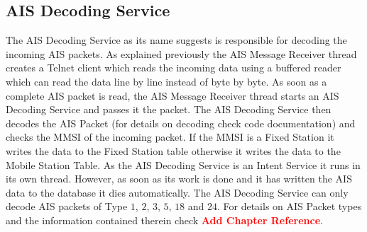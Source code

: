 \subsection{AIS Decoding Service}
\label{sec:sec5_2_3}
\noindent
%
The AIS Decoding Service as its name suggests is responsible for decoding the incoming AIS packets. As explained previously the AIS Message Receiver thread creates a Telnet client which reads the incoming data using a buffered reader which can read the data line by line instead of byte by byte. As soon as a complete AIS packet is read, the AIS Message Receiver thread starts an AIS Decoding Service and passes it the packet. 
\newline
\noindent
The AIS Decoding Service then decodes the AIS Packet (for details on decoding check code documentation) and checks the MMSI of the incoming packet. If the MMSI is a Fixed Station it writes the data to the Fixed Station table otherwise it writes the data to the Mobile Station Table.
\newline
\noindent 
As the AIS Decoding Service is an Intent Service it runs in its own thread. However, as soon as its work is done and it has written the AIS data to the database it dies automatically.
\newline
\noindent
The AIS Decoding Service can only decode AIS packets of Type $1$, $2$, $3$, $5$, $18$ and $24$. For details on AIS Packet types and the information contained therein check \textbf{\textcolor{red}{Add Chapter Reference}}.
%
